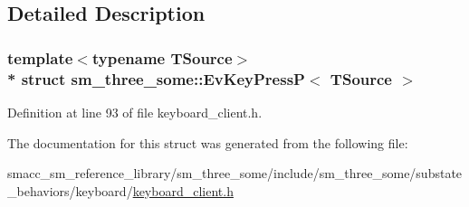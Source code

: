 \subsection{Detailed Description}
\subsubsection*{template$<$typename T\+Source$>$\\*
struct sm\+\_\+three\+\_\+some\+::\+Ev\+Key\+Press\+P$<$ T\+Source $>$}



Definition at line 93 of file keyboard\+\_\+client.\+h.



The documentation for this struct was generated from the following file\+:\begin{DoxyCompactItemize}
\item 
smacc\+\_\+sm\+\_\+reference\+\_\+library/sm\+\_\+three\+\_\+some/include/sm\+\_\+three\+\_\+some/substate\+\_\+behaviors/keyboard/\hyperlink{keyboard__client_8h}{keyboard\+\_\+client.\+h}\end{DoxyCompactItemize}
